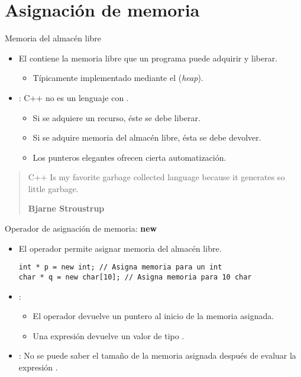 \section{Asignación de memoria}

\begin{frame}[t]{Memoria del almacén libre}
\begin{itemize}
  \item El  contiene la memoria libre que un programa
        puede adquirir y liberar.
    \begin{itemize}
      \item Típicamente implementado mediante el  (\emph{heap}).
    \end{itemize}

  \item {}: C++ no es un lenguaje con 
        .
    \begin{itemize}
      \item Si se adquiere un recurso, éste se debe liberar.
      \item Si se adquire memoria del almacén libre, ésta se debe devolver.
      \item Los punteros elegantes ofrecen cierta automatización.
    \end{itemize}
\end{itemize}

\begin{quote}
C++ Is my favorite garbage collected language because it generates so little garbage.

\textbf{Bjarne Stroustrup}
\end{quote}
\end{frame}

\begin{frame}[t,fragile]{Operador de asignación de memoria: \textbf{new}}
\begin{itemize}
  \item El operador  permite asignar memoria del almacén libre.
\begin{lstlisting}
int * p = new int; // Asigna memoria para un int
char * q = new char[10]; // Asigna memoria para 10 char
\end{lstlisting}

  \item {}:
    \begin{itemize}
      \item El operador  devuelve un puntero al inicio de la memoria asignada.
      \item Una expresión   devuelve un valor de tipo .
    \end{itemize}

  \item {}: No se puede saber el tamaño de la memoria asignada 
        después de evaluar la expresión .
\end{itemize}
\end{frame}


